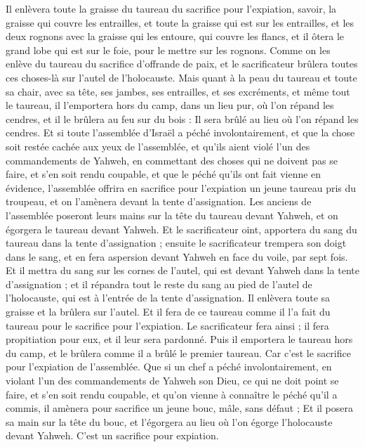 \begin{multicols}{2}
Il enlèvera toute la graisse du taureau du sacrifice pour l'expiation, savoir, la graisse qui couvre les entrailles, et toute la graisse qui est sur les entrailles,
et les deux rognons avec la graisse qui les entoure, qui couvre les flancs, et il ôtera le grand lobe qui est sur le foie, pour le mettre sur les rognons.
Comme on les enlève du taureau du sacrifice d'offrande de paix, et le sacrificateur brûlera toutes ces choses-là sur l'autel de l'holocauste.
Mais quant à la peau du taureau et toute sa chair, avec sa tête, ses jambes, ses entrailles, et ses excréments,
et même tout le taureau, il l'emportera hors du camp, dans un lieu pur, où l'on répand les cendres, et il le brûlera au feu sur du bois : Il sera brûlé au lieu où l'on répand les cendres.
Et si toute l'assemblée d'Israël a péché involontairement, et que la chose soit restée cachée aux yeux de l'assemblée, et qu'ils aient violé l'un des commandements de Yahweh, en commettant des choses qui ne doivent pas se faire, et s'en soit rendu coupable,
et que le péché qu'ils ont fait vienne en évidence, l'assemblée offrira en sacrifice pour l'expiation un jeune taureau pris du troupeau, et on l'amènera devant la tente d'assignation.
Les anciens de l'assemblée poseront leurs mains sur la tête du taureau devant Yahweh, et on égorgera le taureau devant Yahweh.
Et le sacrificateur oint, apportera du sang du taureau dans la tente d'assignation ;
ensuite le sacrificateur trempera son doigt dans le sang, et en fera aspersion devant Yahweh en face du voile, par sept fois.
Et il mettra du sang sur les cornes de l'autel, qui est devant Yahweh dans la tente d'assignation ; et il répandra tout le reste du sang au pied de l'autel de l'holocauste, qui est à l'entrée de la tente d'assignation.
Il enlèvera toute sa graisse et la brûlera sur l'autel.
Et il fera de ce taureau comme il l'a fait du taureau pour le sacrifice pour l'expiation. Le sacrificateur fera ainsi ; il fera propitiation pour eux, et il leur sera pardonné.
Puis il emportera le taureau hors du camp, et le brûlera comme il a brûlé le premier taureau. Car c'est le sacrifice pour l'expiation de l'assemblée.
Que si un chef a péché involontairement, en violant l'un des commandements de Yahweh son Dieu, ce qui ne doit point se faire, et s'en soit rendu coupable,
et qu'on vienne à connaître le péché qu'il a commis, il amènera pour sacrifice un jeune bouc, mâle, sans défaut ;
Et il posera sa main sur la tête du bouc, et l'égorgera au lieu où l'on égorge l'holocauste devant Yahweh. C'est un sacrifice pour expiation.

\end{multicols}
